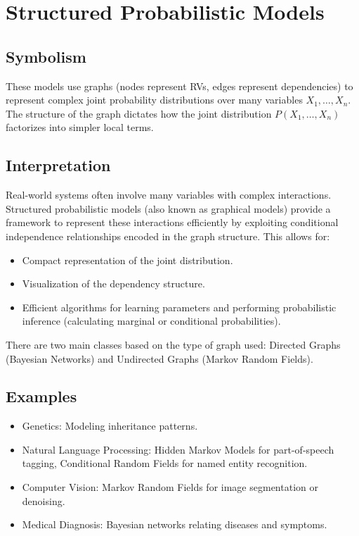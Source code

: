 \documentclass{article}
\begin{document}
\section{Structured Probabilistic Models}

\subsection*{Symbolism}
These models use graphs (nodes represent RVs, edges represent dependencies) to represent complex joint probability distributions over many variables $X_1, \dots, X_n$. The structure of the graph dictates how the joint distribution $P(X_1, \dots, X_n)$ factorizes into simpler local terms.

\subsection*{Interpretation}
Real-world systems often involve many variables with complex interactions. Structured probabilistic models (also known as graphical models) provide a framework to represent these interactions efficiently by exploiting conditional independence relationships encoded in the graph structure. This allows for:
\begin{itemize}
    \item Compact representation of the joint distribution.
    \item Visualization of the dependency structure.
    \item Efficient algorithms for learning parameters and performing probabilistic inference (calculating marginal or conditional probabilities).
\end{itemize}
There are two main classes based on the type of graph used: Directed Graphs (Bayesian Networks) and Undirected Graphs (Markov Random Fields).

\subsection*{Examples}
\begin{itemize}
    \item Genetics: Modeling inheritance patterns.
    \item Natural Language Processing: Hidden Markov Models for part-of-speech tagging, Conditional Random Fields for named entity recognition.
    \item Computer Vision: Markov Random Fields for image segmentation or denoising.
    \item Medical Diagnosis: Bayesian networks relating diseases and symptoms.
\end{itemize}
\end{document}
